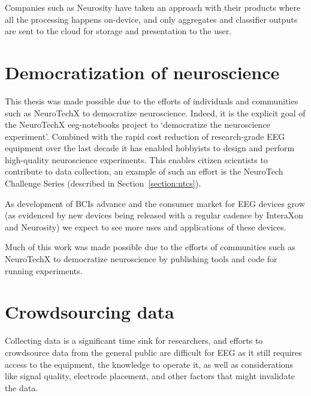     Companies such as Neurosity have taken an approach with their products where all the processing happens on-device, and only aggregates and classifier outputs are sent to the cloud for storage and presentation to the user.



\section{Democratization of neuroscience}

    This thesis was made possible due to the efforts of individuals and communities such as NeuroTechX to democratize neuroscience. Indeed, it is the explicit goal of the NeuroTechX eeg-notebooks project to `democratize the neuroscience experiment'. Combined with the rapid cost reduction of research-grade EEG equipment over the last decade it has enabled hobbyists to design and perform high-quality neuroscience experiments. This enables citizen scientists to contribute to data collection, an example of such an effort is the NeuroTech Challenge Series (described in Section~\ref{section:ntcs}).

    As development of BCIs advance and the consumer market for EEG devices grow (as evidenced by new devices being released with a regular cadence by InteraXon and Neurosity) we expect to see more uses and applications of these devices.

    Much of this work was made possible due to the efforts of communities such as NeuroTechX to democratize neuroscience by publishing tools and code for running experiments.

\section{Crowdsourcing data}

    Collecting data is a significant time sink for researchers, and efforts to crowdsource data from the general public are difficult for EEG as it still requires access to the equipment, the knowledge to operate it, as well as considerations like signal quality, electrode placement, and other factors that might invalidate the data.

